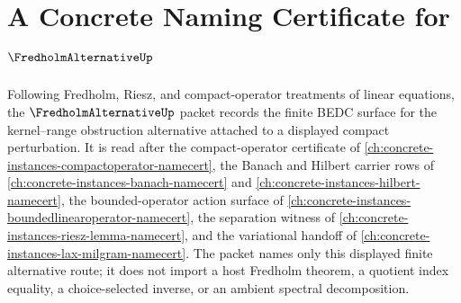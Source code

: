 \chapter{A Concrete Naming Certificate for $\FredholmAlternativeUp$}
\label{ch:concrete-instances-fredholm-alternative-namecert}

Following Fredholm, Riesz, and compact-operator treatments of linear equations, the $\FredholmAlternativeUp$ packet records the finite BEDC surface for the kernel--range obstruction alternative attached to a displayed compact perturbation. It is read after the compact-operator certificate of \autoref{ch:concrete-instances-compactoperator-namecert}, the Banach and Hilbert carrier rows of \autoref{ch:concrete-instances-banach-namecert} and \autoref{ch:concrete-instances-hilbert-namecert}, the bounded-operator action surface of \autoref{ch:concrete-instances-boundedlinearoperator-namecert}, the separation witness of \autoref{ch:concrete-instances-riesz-lemma-namecert}, and the variational handoff of \autoref{ch:concrete-instances-lax-milgram-namecert}. The packet names only this displayed finite alternative route; it does not import a host Fredholm theorem, a quotient index equality, a choice-selected inverse, or an ambient spectral decomposition.

